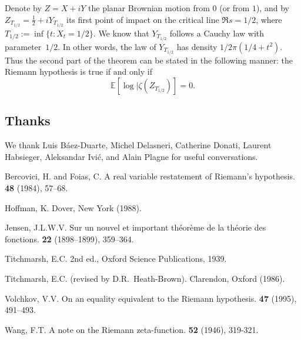 \documentclass{article}
\begin{document}
Denote by $Z=X+iY$ the planar Brownian motion from $0$ (or from $1$), and by $Z_{T_{1/2}}=\frac12+iY_{T_{1/2}}$ its first point of impact on the critical line $\Re s=1/2$, where $T_{1/2}:=\inf\{t:X_t=1/2\}$.
We know that $Y_{T_{1/2}}$ follows a Cauchy law with parameter~$1/2$.
In other words, the law of $Y_{T_{1/2}}$ has density $1/2\pi(1/4+t^2)$.
Thus the second part of the theorem can be stated in the following manner: the Riemann hypothesis is true if and only if
\[
  \mathbb{E}[\log|\zeta(Z_{T_{1/2}})] = 0.
\]


\subsection*{Thanks}

We thank Luis B\'{a}ez-Duarte, Michel Delasneri, Catherine Donati, Laurent Habsieger, Aleksandar Ivi\'{c}, and Alain Plagne for useful conversations.



\nocite{*}

\begin{thebibliography}{7}

  {Bercovici, H. and Foias, C.}
  \newblock A real variable restatement of Riemann's hypothesis.
   \textbf{48} (1984), 57--68.

  {Hoffman, K.}
  \newblock Dover, New York (1988).

  {Jensen, J.L.W.V.}
  \newblock Sur un nouvel et important th\'{e}or\`{e}me de la th\'{e}orie des fonctions.
   \textbf{22} (1898--1899), 359--364.

  {Titchmarsh, E.C.}
  \newblock 2nd ed., Oxford Science Publications, 1939.

  {Titchmarsh, E.C.}
   (revised by D.R.~Heath-Brown).
  \newblock Clarendon, Oxford (1986).

  {Volchkov, V.V.}
  \newblock On an equality equivalent to the Riemann hypothesis.
   \textbf{47} (1995), 491--493.

  {Wang, F.T.}
  \newblock A note on the Riemann zeta-function.
   \textbf{52} (1946), 319-321.

\end{thebibliography}
\end{document}
